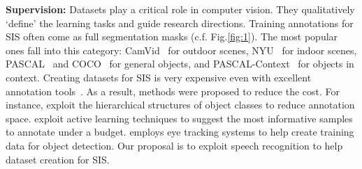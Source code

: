 \documentclass[runningheads]{llncs}
\begin{document}
\noindent
\textbf{Supervision:} Datasets play a critical role in computer
vision. They qualitatively `define' the learning tasks and guide
research directions.
Training annotations for SIS often come as full segmentation masks
(c.f. Fig.\ref{fig:1}). The most popular ones fall into this
category: CamVid~\citep{camvid:data} for outdoor scenes,
NYU~\citep{NYU} for indoor scenes, PASCAL~\citep{pascal:2011} and
COCO~\citep{coco:eccv} for general objects, and
PASCAL-Context~\citep{pascal:context} for objects in context.  Creating
datasets for SIS is very expensive even with excellent annotation
tools~\citep{open:surface, label:me}. As a result, methods were
proposed to reduce the cost.  For instance, \citep{scalable:annotation,
  coco:eccv} exploit the hierarchical structures of object classes to
reduce annotation space. \citep{AFrameSel, expected:loss} exploit
active learning techniques to suggest the most informative samples to
annotate under a budget. \citep{detect:eyetr} employs eye tracking
systems to help create training data for object detection.  Our
proposal is to exploit speech recognition to help dataset creation for
SIS.







\end{document}
